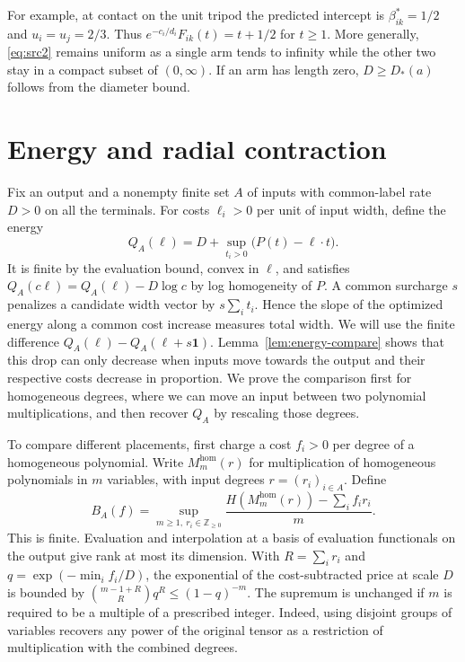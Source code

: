 For example, at contact on the unit tripod the predicted intercept
is $\beta^*_{ik}=1/2$ and $u_i=u_j=2/3$. Thus
$e^{-c_i/d_i}F_{ik}(t)=t+1/2$ for $t\ge1$. More generally,
\eqref{eq:src2} remains uniform as a single arm tends to infinity
while the other two stay in a compact subset of $(0,\infty)$.
If an arm has length zero, $D\ge D_*(a)$ follows from the diameter bound.

\section{Energy and radial contraction}\label{sec:energy}

Fix an output and a nonempty finite set $A$ of inputs with common-label
rate $D>0$ on all the terminals. For costs $\ell_i>0$ per unit of input
width, define the energy
\begin{equation}\label{eq:energy-widths}
 Q_A(\ell)=D+\sup_{t_i>0}\bigl(P(t)-\ell\cdot t\bigr).
\end{equation}
It is finite by the evaluation bound, convex in $\ell$, and satisfies
$Q_A(c\ell)=Q_A(\ell)-D\log c$ by log homogeneity of $P$.
A common surcharge $s$ penalizes a candidate width vector by
$s\sum_i t_i$. Hence the slope of the optimized energy along a common
cost increase measures total width. We will use the finite difference
$Q_A(\ell)-Q_A(\ell+s\mathbf1)$.
Lemma~\ref{lem:energy-compare} shows that this drop can only decrease
when inputs move towards the output and their respective costs decrease
in proportion. We prove the comparison first for homogeneous degrees,
where we can move an input between two polynomial multiplications,
and then recover $Q_A$ by rescaling those degrees.

To compare different placements, first charge a cost $f_i>0$ per
degree of a homogeneous polynomial.
Write $M_m^{\mathrm{hom}}(r)$ for multiplication of homogeneous
polynomials in $m$ variables, with input degrees $r=(r_i)_{i\in A}$.
Define
\[
 B_A(f)=\sup_{m\ge1,\ r_i\in\mathbb Z_{\ge0}}
 \frac{H(M_m^{\mathrm{hom}}(r))-\sum_i f_i r_i}{m}.
\]
This is finite. Evaluation and interpolation at a basis of evaluation
functionals on the output give rank at most its dimension. With
$R=\sum_i r_i$ and $q=\exp(-\min_i f_i/D)$, the exponential of the
cost-subtracted price at scale $D$ is bounded by
$\binom{m-1+R}{R}q^R\le(1-q)^{-m}$. The supremum is unchanged if $m$
is required to be a multiple of a prescribed integer. Indeed, using
disjoint groups of variables recovers any power of the original tensor
as a restriction of multiplication with the combined degrees.

